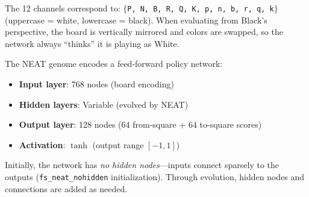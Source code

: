 \documentclass[11pt, twocolumn]{article}
\begin{document}
The 12 channels correspond to: $\{$\texttt{P, N, B, R, Q, K, p, n, b, r, q, k}$\}$ (uppercase = white, lowercase = black). When evaluating from Black's perspective, the board is vertically mirrored and colors are swapped, so the network always ``thinks'' it is playing as White.

The NEAT genome encodes a feed-forward policy network:
\begin{itemize}[leftmargin=*, itemsep=1pt]
    \item \textbf{Input layer}: 768 nodes (board encoding)
    \item \textbf{Hidden layers}: Variable (evolved by NEAT)
    \item \textbf{Output layer}: 128 nodes (64 from-square + 64 to-square scores)
    \item \textbf{Activation}: $\tanh$ (output range $[-1, 1]$)
\end{itemize}

Initially, the network has \emph{no hidden nodes}---inputs connect sparsely to the outputs (\texttt{fs\_neat\_nohidden} initialization). Through evolution, hidden nodes and connections are added as needed.
\end{document}
